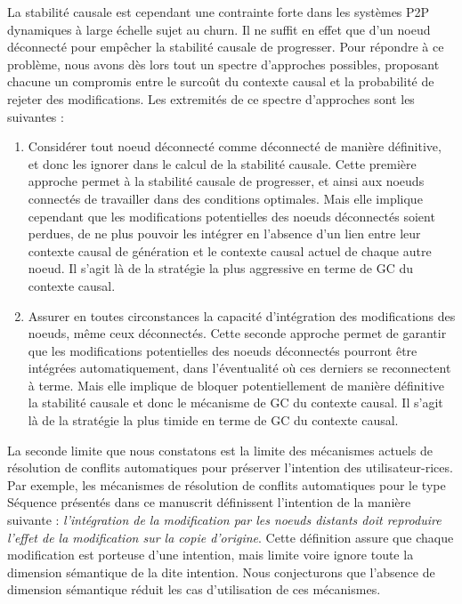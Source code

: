 La stabilité causale est cependant une contrainte forte dans les systèmes \ac{P2P} dynamiques à large échelle sujet au churn.
Il ne suffit en effet que d'un noeud déconnecté pour empêcher la stabilité causale de progresser.
Pour répondre à ce problème, nous avons dès lors tout un spectre d'approches possibles, proposant chacune un compromis entre le surcoût du contexte causal et la probabilité de rejeter des modifications.
Les extremités de ce spectre d'approches sont les suivantes :
\begin{enumerate}
    \item Considérer tout noeud déconnecté comme déconnecté de manière définitive, et donc les ignorer dans le calcul de la stabilité causale.
        Cette première approche permet à la stabilité causale de progresser, et ainsi aux noeuds connectés de travailler dans des conditions optimales.
        Mais elle implique cependant que les modifications potentielles des noeuds déconnectés soient perdues, \ie de ne plus pouvoir les intégrer en l'absence d'un lien entre leur contexte causal de génération et le contexte causal actuel de chaque autre noeud.
        Il s'agit là de la stratégie la plus aggressive en terme de \ac{GC} du contexte causal.
    \item Assurer en toutes circonstances la capacité d'intégration des modifications des noeuds, même ceux déconnectés.
        Cette seconde approche permet de garantir que les modifications potentielles des noeuds déconnectés pourront être intégrées automatiquement, dans l'éventualité où ces derniers se reconnectent à terme.
        Mais elle implique de bloquer potentiellement de manière définitive la stabilité causale et donc le mécanisme de \ac{GC} du contexte causal.
        Il s'agit là de la stratégie la plus timide en terme de \ac{GC} du contexte causal.
\end{enumerate}

La seconde limite que nous constatons est la limite des mécanismes actuels de résolution de conflits automatiques pour préserver l'intention des utilisateur-rices.
Par exemple, les mécanismes de résolution de conflits automatiques pour le type Séquence présentés dans ce manuscrit  définissent l'intention de la manière suivante : \emph{l'intégration de la modification par les noeuds distants doit reproduire l'effet de la modification sur la copie d'origine}.
Cette définition assure que chaque modification est porteuse d'une intention, mais limite voire ignore toute la dimension sémantique de la dite intention.
Nous conjecturons que l'absence de dimension sémantique réduit les cas d'utilisation de ces mécanismes.

